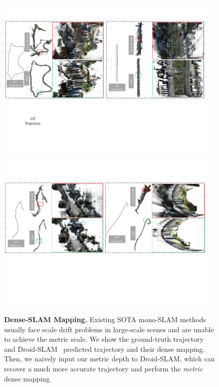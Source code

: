 \begin{figure}[]
\centering
\includegraphics[width=0.95\textwidth]{./files/supp_slam1.pdf}
\includegraphics[width=0.95\textwidth]{./files/supp_slam2.pdf}
\caption{\textbf{Dense-SLAM Mapping.} Existing SOTA mono-SLAM methods usually face scale drift problems in large-scale scenes and are unable to achieve the metric scale. We show the ground-truth trajectory and Droid-SLAM~\cite{teed2021droid} predicted trajectory and their dense mapping. Then, we naively input our metric depth to Droid-SLAM, which can recover a much more accurate trajectory and perform the \textit{metric} dense mapping. }
\label{fig: dense_slam1.}
\end{figure}


